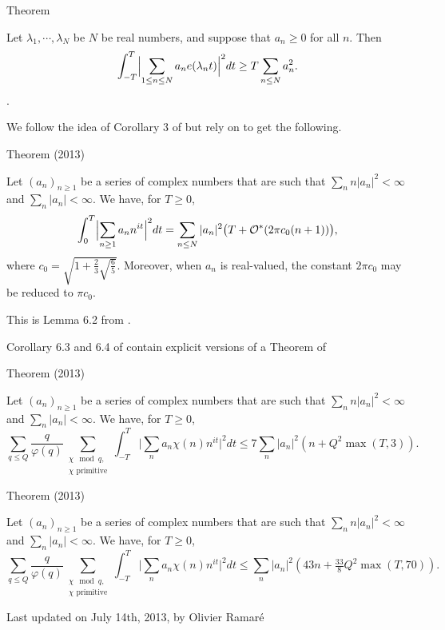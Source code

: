 \begin{thm}{Theorem}

  Let $\lambda_1,\cdots,\lambda_N$ be $N$ be real numbers, and suppose
  that $a_n\ge 0$ for all $n$. Then
  $$
  \int_{-T}^T\Bigl|\sum_{1\le n\le N}a_n e(\lambda_n t)\Bigr|^2dt
  \ge
  T \sum_{n\le N}a_n^2.
  $$.
\end{thm}



We follow the idea of Corollary 3 of
\cite{Montgomery-Vaughan*74}
but rely on
\cite{Preissmann*84} to get the following.

\begin{thm}{Theorem (2013)}

  Let $(a_n)_{n\ge1}$ be a series of complex numbers that are such that
  $\sum_n n|a_n|^2 < \infty$ and $\sum_n |a_n| < \infty$. We have, for $T\ge0$,
  \begin{equation*}
    \int_0^T\Bigl|
    \sum_{n\ge1} a_{n}n^{it}
    \Bigr|^{2}dt = 
    \sum_{n\le N}|a_n|^2 \bigl(T+\mathcal{O}^*(2\pi c_0(n+1))\bigr),
  \end{equation*}
  where $c_0=\sqrt{1+\frac23\sqrt{\frac{6}{5}}}$. Moreover, when $a_n$ is
  real-valued, the constant $2\pi c_0$ may be reduced to $\pi c_0$.
\end{thm}

This is Lemma 6.2 from \cite{Ramare*13d}.


Corollary 6.3 and 6.4 of
\cite{Ramare*13d}
contain explicit versions of a Theorem of
\cite{Gallagher*70}


\begin{thm}{Theorem (2013)}

  Let $(a_n)_{n\ge1}$ be a series of complex numbers that are such that
  $\sum_n n|a_n|^2 < \infty$ and $\sum_n |a_n| < \infty$. We have, for $T\ge0$,
  $$
  \sum_{q\le Q}\frac{q}{\varphi(q)}
  \sum_{\substack{\chi\mod q,\\ \text{$\chi$ primitive}}}
  \int_{-T}^T
    \biggl|\sum_{n}a_n \chi(n)n^{it}\biggr|^2dt
    \le
    7
    \sum_{n}|a_n|^2( n+ Q^2\max(T, 3) ).
  $$
\end{thm}



\begin{thm}{Theorem (2013)}

  Let $(a_n)_{n\ge1}$ be a series of complex numbers that are such that
  $\sum_n n|a_n|^2 < \infty$ and $\sum_n |a_n| < \infty$. We have, for $T\ge0$,
  $$
  \sum_{q\le Q}\frac{q}{\varphi(q)}
  \sum_{\substack{\chi\mod q,\\ \text{$\chi$ primitive}}}
  \int_{-T}^T
    \biggl|\sum_{n}a_n \chi(n)n^{it}\biggr|^2dt
    \le
    \sum_{n}|a_n|^2( 43n+ \tfrac{33}{8} Q^2\max(T, 70) ).
  $$
\end{thm}




 
 








  
  Last updated on July 14th, 2013, by Olivier Ramar\'e
















